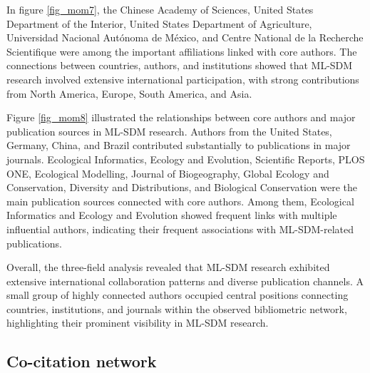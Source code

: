\documentclass[authoryear,preprint,review,12pt]{elsarticle}
\begin{document}
In figure \ref{fig_mom7}, the Chinese Academy of Sciences, United States Department of the Interior, United States Department of Agriculture, Universidad Nacional Autónoma de México, and Centre National de la Recherche Scientifique were among the important affiliations linked with core authors. The connections between countries, authors, and institutions showed that ML-SDM research involved extensive international participation, with strong contributions from North America, Europe, South America, and Asia.

Figure \ref{fig_mom8} illustrated the relationships between core authors and major publication sources in ML-SDM research. Authors from the United States, Germany, China, and Brazil contributed substantially to publications in major journals. Ecological Informatics, Ecology and Evolution, Scientific Reports, PLOS ONE, Ecological Modelling, Journal of Biogeography, Global Ecology and Conservation, Diversity and Distributions, and Biological Conservation were the main publication sources connected with core authors. Among them, Ecological Informatics and Ecology and Evolution showed frequent links with multiple influential authors, indicating their frequent associations with ML-SDM-related publications.

Overall, the three-field analysis revealed that ML-SDM research exhibited extensive international collaboration patterns and diverse publication channels. A small group of highly connected authors occupied central positions connecting countries, institutions, and journals within the observed bibliometric network, highlighting their prominent visibility in ML-SDM research.


\subsection{Co-citation network}
\end{document}
